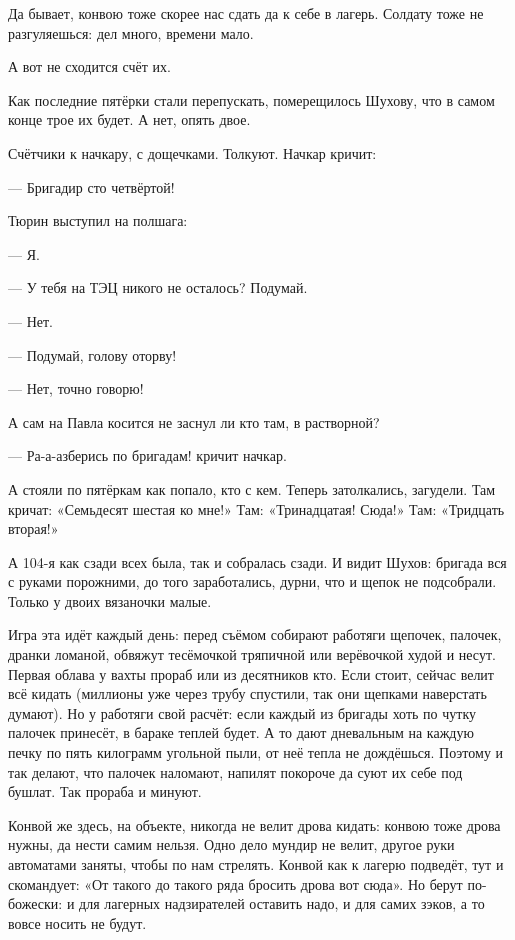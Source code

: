 Да бывает, конвою тоже скорее нас сдать \dash да к себе в лагерь. Солдату тоже не разгуляешься:
дел много, времени мало.

А вот не сходится счёт их.

Как последние пятёрки стали перепускать, померещилось Шухову, что в самом конце трое их
будет. А нет, опять двое.

Счётчики к начкару, с дощечками. Толкуют. Начкар кричит:

--- Бригадир сто четвёртой!

Тюрин выступил на полшага:

--- Я.

--- У тебя на ТЭЦ никого не осталось? Подумай.

--- Нет.

--- Подумай, голову оторву!

--- Нет, точно говорю!

А сам на Павла косится \dash не заснул ли кто там, в растворной?

--- Ра-а-азберись по бригадам! \dash кричит начкар.

А стояли по пятёркам как попало, кто с кем. Теперь затолкались, загудели. Там кричат:
«Семьдесят шестая \dash ко мне!» Там: «Тринадцатая! Сюда!» Там: «Тридцать вторая!»

А 104-я как сзади всех была, так и собралась сзади. И видит Шухов: бригада вся с руками
порожними, до того заработались, дурни, что и щепок не подсобрали. Только у двоих вязаночки
малые.

Игра эта идёт каждый день: перед съёмом собирают работяги щепочек, палочек, дранки ломаной,
обвяжут тесёмочкой тряпичной или верёвочкой худой и несут. Первая облава \dash у вахты прораб
или из десятников кто. Если стоит, сейчас велит всё кидать (миллионы уже через трубу
спустили, так они щепками наверстать думают). Но у работяги свой расчёт: если каждый из
бригады хоть по чутку палочек принесёт, в бараке теплей будет. А то дают дневальным на каждую
печку по пять килограмм угольной пыли, от неё тепла не дождёшься. Поэтому и так делают, что
палочек наломают, напилят покороче да суют их себе под бушлат. Так прораба и минуют.

Конвой же здесь, на объекте, никогда не велит дрова кидать: конвою тоже дрова нужны, да нести
самим нельзя. Одно дело \dash мундир не велит, другое \dash руки автоматами заняты, чтобы по нам
стрелять. Конвой как к лагерю подведёт, тут и скомандует: «От такого до такого ряда бросить
дрова вот сюда». Но берут по-божески: и для лагерных надзирателей оставить надо, и для самих
зэков, а то вовсе носить не будут.

